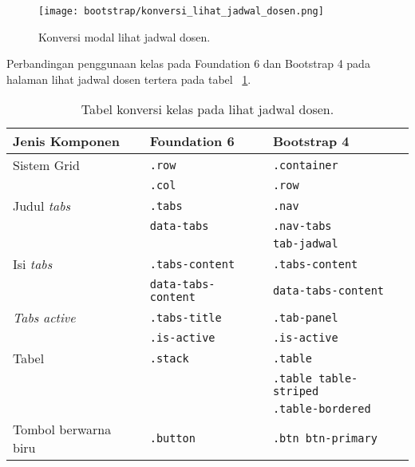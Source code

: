 \begin{figure} [H]
	\centering  
	\texttt{[image: bootstrap/konversi\_lihat\_jadwal\_dosen.png]}
	\caption{Konversi modal lihat jadwal dosen.}
	\label{fig:konversiLihatJadwalDosen}
\end{figure}

\noindent Perbandingan penggunaan kelas pada Foundation 6 dan Bootstrap 4 pada halaman lihat jadwal dosen tertera pada tabel ~\ref{table:konversiLihatJadwalDosen}.\\
 
\begin{table}[H]
	\caption{Tabel konversi kelas pada lihat jadwal dosen.}
	\begin{tabular}{| p{} | p{} | p{} |} 
		\hline
		\textbf{Jenis Komponen} & \textbf{Foundation 6} & \textbf{Bootstrap 4}  \\ [0.5ex]
		\hline	
		Sistem Grid & \texttt{.row} & \texttt{.container}  \\ 
		&\texttt{.col} & \texttt{.row}\\
		\hline	
		Judul \textit{tabs} & \texttt{.tabs}  &\texttt{.nav} \\
		&\texttt{data-tabs}&\texttt{.nav-tabs}\\
		&&\texttt{tab-jadwal}\\
		\hline
		Isi \textit{tabs} &\texttt{.tabs-content} & \texttt{.tabs-content}  \\
		&\texttt{data-tabs-content} & \texttt{data-tabs-content} \\
		\hline
		\textit{Tabs active} &\texttt{.tabs-title}  & \texttt{.tab-panel}  \\
		&\texttt{.is-active}&\texttt{.is-active}\\
		\hline	
		Tabel & \texttt{.stack} &\texttt{.table} \\
		&&  \texttt{.table table-striped} \\
		&&\texttt{.table-bordered}  \\
		\hline
		Tombol berwarna biru & \texttt{.button} & \texttt{.btn btn-primary}\\ [1ex]
		\hline		
	\end{tabular}
	\label{table:konversiLihatJadwalDosen}
\end{table}